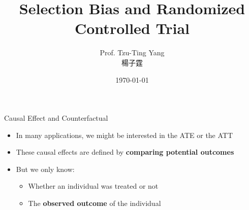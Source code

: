 \documentclass[hyperref={pdfpagelabels=false}]{beamer}
\title[Selection Bias \& RCT]{Selection Bias and Randomized Controlled Trial}
\author{Prof. Tzu-Ting Yang \\ 楊子霆}
\institute{Institute of Economics, Academia Sinica \\ 中央研究院經濟研究所}
\date{\today}
\begin{document}
	
	\begin{frame}{}
		\titlepage
	\end{frame}




\begin{frame}{Causal Effect and Counterfactual}
	\begin{itemize}
		
		
		\item In many applications, we might be interested in the ATE or the ATT
				\vspace{0.2cm}
		\item These causal effects are defined by \textbf{comparing potential outcomes}
								\vspace{0.2cm}
		\item But we only know:	
						\vspace{0.2cm}					
				\begin{itemize}
					\item Whether an individual was treated or not
													\vspace{0.2cm}
					\item The \textbf{observed outcome} of the individual
				\end{itemize}
	
		
	\end{itemize}
\end{frame}
    
\end{document}
